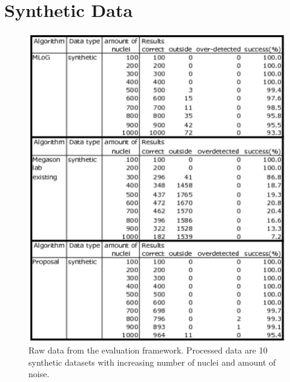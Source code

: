 \section{Synthetic Data}
\begin{figure}[H]
  \centering
  \includegraphics[width=1\textwidth]{pictures/evalTest}          
  \caption{Raw data from the evaluation framework. Processed data are 10 synthetic datasets with increasing number of nuclei and amount of noise.}
  \label{tab:syntheEvalRaw}
\end{figure}


